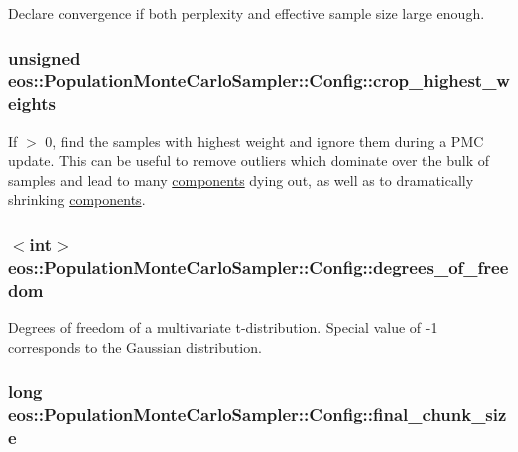 Declare convergence if both perplexity and effective sample size large enough. \hypertarget{structeos_1_1PopulationMonteCarloSampler_1_1Config_a394bc4c560e738d420fa34014745a7b7}{
\subsubsection[{crop\_\-highest\_\-weights}]{\setlength{\rightskip}{0pt plus 5cm}unsigned {\bf eos::PopulationMonteCarloSampler::Config::crop\_\-highest\_\-weights}}}
\label{structeos_1_1PopulationMonteCarloSampler_1_1Config_a394bc4c560e738d420fa34014745a7b7}
If $>$ 0, find the samples with highest weight and ignore them during a PMC update. This can be useful to remove outliers which dominate over the bulk of samples and lead to many \hyperlink{namespaceeos_1_1components}{components} dying out, as well as to dramatically shrinking \hyperlink{namespaceeos_1_1components}{components}. \hypertarget{structeos_1_1PopulationMonteCarloSampler_1_1Config_ad4069f57b2c8b33032680a27b62fd5cf}{
\subsubsection[{degrees\_\-of\_\-freedom}]{$<$int$>$ {\bf eos::PopulationMonteCarloSampler::Config::degrees\_\-of\_\-freedom}}}
\label{structeos_1_1PopulationMonteCarloSampler_1_1Config_ad4069f57b2c8b33032680a27b62fd5cf}
Degrees of freedom of a multivariate t-\/distribution. Special value of -\/1 corresponds to the Gaussian distribution. \hypertarget{structeos_1_1PopulationMonteCarloSampler_1_1Config_ac5a61846614b1bb67bdde95df03b5663}{
\subsubsection[{final\_\-chunk\_\-size}]{\setlength{\rightskip}{0pt plus 5cm}long {\bf eos::PopulationMonteCarloSampler::Config::final\_\-chunk\_\-size}}}
\label{structeos_1_1PopulationMonteCarloSampler_1_1Config_ac5a61846614b1bb67bdde95df03b5663}


